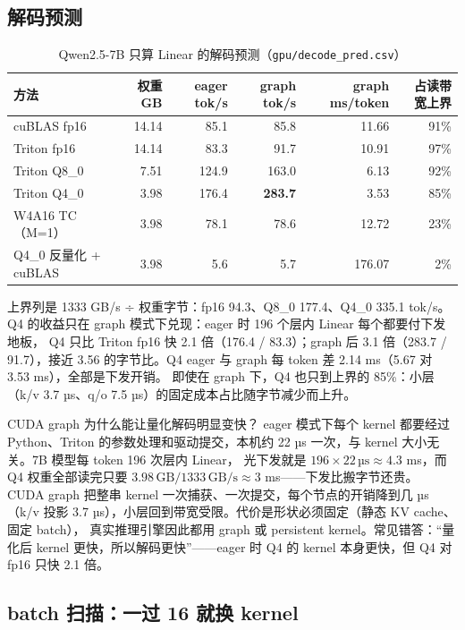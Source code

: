 \documentclass[11pt,a4paper]{ctexart}
\begin{document}
\subsection{解码预测}

\begin{table}[H]
\centering\small
\caption{Qwen2.5-7B 只算 Linear 的解码预测（\texttt{gpu/decode\_pred.csv}）}\label{tab:decode}
\begin{tabular}{lrrrrr}
\toprule
方法 & 权重 GB & eager tok/s & graph tok/s & graph ms/token & 占读带宽上界 \\
\midrule
cuBLAS fp16 & 14.14 & 85.1 & 85.8 & 11.66 & 91\% \\
Triton fp16 & 14.14 & 83.3 & 91.7 & 10.91 & 97\% \\
Triton Q8\_0 & 7.51 & 124.9 & 163.0 & 6.13 & 92\% \\
Triton Q4\_0 & 3.98 & 176.4 & \textbf{283.7} & 3.53 & 85\% \\
W4A16 TC（M=1） & 3.98 & 78.1 & 78.6 & 12.72 & 23\% \\
Q4\_0 反量化 + cuBLAS & 3.98 & 5.6 & 5.7 & 176.07 & 2\% \\
\bottomrule
\end{tabular}
\end{table}

上界列是 1333 GB/s ÷ 权重字节：fp16 94.3、Q8\_0 177.4、Q4\_0 335.1 tok/s。Q4 的收益只在 graph 模式下兑现：eager 时 196 个层内 Linear 每个都要付下发地板，
Q4 只比 Triton fp16 快 2.1 倍（176.4 / 83.3）；graph 后 3.1 倍（283.7 / 91.7），接近 3.56 的字节比。Q4 eager 与 graph 每 token 差 2.14 ms（5.67 对 3.53 ms），全部是下发开销。
即使在 graph 下，Q4 也只到上界的 85\%：小层（k/v 3.7 µs、q/o 7.5 µs）的固定成本占比随字节减少而上升。

\begin{iqbox}{CUDA graph 为什么能让量化解码明显变快？}
eager 模式下每个 kernel 都要经过 Python、Triton 的参数处理和驱动提交，本机约 22 µs 一次，与 kernel 大小无关。7B 模型每 token 196 次层内 Linear，
光下发就是 $196 \times 22\,\text{µs} \approx 4.3$ ms，而 Q4 权重全部读完只要 $3.98\,\text{GB} / 1333\,\text{GB/s} \approx 3$ ms——下发比搬字节还贵。
CUDA graph 把整串 kernel 一次捕获、一次提交，每个节点的开销降到几 µs（k/v 投影 3.7 µs），小层回到带宽受限。代价是形状必须固定（静态 KV cache、固定 batch），
真实推理引擎因此都用 graph 或 persistent kernel。常见错答：“量化后 kernel 更快，所以解码更快”——eager 时 Q4 的 kernel 本身更快，但 Q4 对 fp16 只快 2.1 倍。
\end{iqbox}

\subsection{batch 扫描：一过 16 就换 kernel}
\end{document}
